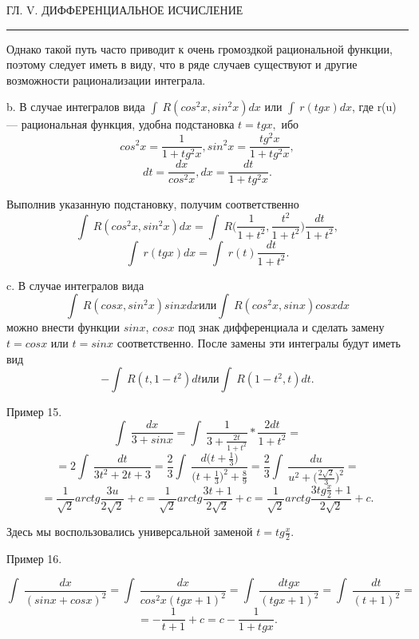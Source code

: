 \documentclass[10pt]{article}
\begin{document}
    \begin{center}
        \begin{spacing}
            ГЛ. V. ДИФФЕРЕНЦИАЛЬНОЕ ИСЧИСЛЕНИЕ
            \noindent\rule{\textwidth}{1pt}
		\end{spacing}
    \end{center}
    \par Однако такой путь часто приводит к очень громоздкой рациональной функции, поэтому следует иметь в виду, что в ряде случаев существуют и другие возможности рационализации интеграла.
    \par b. В случае интегралов вида  $\int \ R(cos^2x, sin^2x)dx$ или $\int \ r(tgx)dx$, где r(u) — рациональная функция, удобна подстановка $t = tgx,$ ибо
    $$cos^2x = \frac{1}{1 + tg^2x}, sin^2x = \frac{tg^2x}{1 + tg^2x},$$
    $$dt = \frac{dx}{cos^2x}, dx = \frac{dt}{1 + tg^2x}.$$
    
    \par Выполнив указанную подстановку, получим соответственно
    $$\int \ R(cos^2x, sin^2x)dx = \int \ R\bigg(\frac{1}{1 + t^2}, \frac{t^2}{1 + t^2}\bigg)\frac{dt}{1 + t^2},$$
    $$\int \ r(tg x) dx = \int \ r(t)\frac{dt}{1 + t^2}.$$
    \par c. В случае интегралов вида
    $$\int \ R(cosx, sin^2x) sinxdx или \int \ R(cos^2x, sinx) cosxdx$$
    можно внести функции $sinx$, $cosx$ под знак дифференциала и сделать замену $t = cosx$ или $t = sinx$ соответственно. После замены эти интегралы будут иметь вид
    $$-\int \ R(t, 1-t^2)dt или \int \ R(1-t^2,t)dt.$$
    \par Пример 15.
    $$\int \ \frac{dx}{3 + sinx} = \int \ \frac{1}{3 + \frac{2t}{1 + t^2}} * \frac{2 dt}{1 + t^2} = $$  
    $$ = 2 \int \ \frac{dt}{3t^2 + 2t +3} = \frac{2}{3}\int \ \frac{d \bigg(t + \frac{1}{3}\bigg)}{\bigg(t + \frac{1}{3} \bigg)^2 + \frac{8}{9}} = \frac{2}{3} \int \ \frac{du}{u^2 + \bigg(\frac{2\sqrt{2}}{3}\bigg)^2} = $$
    $$ = \frac{1}{\sqrt{2}}arctg\frac{3u}{2\sqrt{2}} + c = \frac{1}{\sqrt{2}}arctg\frac{3t + 1}{2\sqrt{2}} + c = \frac{1}{\sqrt{2}}arctg\frac{3tg\frac{x}{2} + 1}{2\sqrt{2}} + c.$$
    \par Здесь мы воспользовались универсальной заменой $t = tg\frac{x}{2}.$
    \par Пример 16.

    $$\int \ \frac{dx}{(sinx + cosx)^2} = \int \ \frac{dx}{cos^2x(tgx + 1)^2} = \int \ \frac{d tgx}{(tgx + 1)^2} = \int \ \frac{dt}{(t + 1)^2} =$$
    $$= - \frac{1}{t + 1} + c = c - \frac{1}{1 + tgx}.$$
\end{document}
